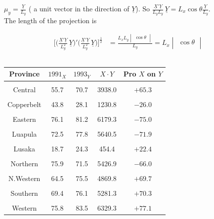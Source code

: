 \documentclass[11pt,a4paper]{article}
\theoremstyle{definition}
\begin{document}
$\mu_y = \frac{\underline{Y}}{L_y}$ ( a unit vector in the direction of $\underline{Y}$). So $\frac{\underline{X}'\underline{Y}}{L_yL_y}\, \underline{Y} = L_x\cos \theta \frac{\underline{Y}}{L_y}$.\\

The length of the projection is 


\begin{align*}
\Bigg[\Bigg(\frac{\underline{X}'\underline{Y}}{L_y^2}\,\underline{Y}\Bigg)'\Bigg(\frac{\underline{X}'\underline{Y}}{L_y^2}\,\underline{Y}\Bigg)\Bigg]^{\frac{1}{2}}
 & = \frac{L_x L_y 
\begin{vmatrix}
\cos \theta\\
\end{vmatrix}  
 }{L_y}
  = L_x \begin{vmatrix}
 \cos \theta\\
 \end{vmatrix}\tag{6}\\
\end{align*}




\begin{table}[H]
\centering
\begin{tabular}{|c|cccc|}
\hline
Province & $1991_X$ & $1993_Y$ & $X\cdot Y$ & Pro $X$ on $Y$\\
\hline
&&&&\\
Central & 55.7 & 70.7 & 3938.0 & $+65.3$\\
&&&&\\
Copperbelt & 43.8 & 28.1 & 1230.8 & $-26.0$\\
&&&&\\
Eastern & 76.1 & 81.2 & 6179.3 & $-75.0$\\
&&&&\\
Luapula & 72.5 & 77.8 & 5640.5 & $-71.9$\\
&&&&\\
Lusaka & 18.7 & 24.3 & 454.4 & $+22.4$\\
&&&&\\
Northern & 75.9 & 71.5 & 5426.9 & $-66.0$\\
&&&&\\
N.Western & 64.5 & 75.5 & 4869.8 & $+69.7$\\
&&&&\\
Southern & 69.4 & 76.1 & 5281.3 & $+70.3$\\
&&&&\\
Western & 75.8 & 83.5 & 6329.3 & $+77.1$\\
\hline
\end{tabular}
\caption{}
\end{table}
\end{document}
